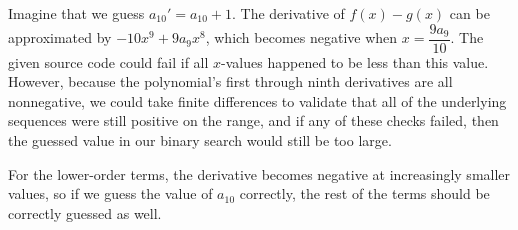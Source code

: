 \documentclass[10pt]{article}
\begin{document}
\begin{flushleft}
Imagine that we guess $a_{10}' = a_{10} + 1$. The derivative of $f(x) - g(x)$ can be approximated by $-10x^9 + 9a_9 x^8$,
which becomes negative when $x = \dfrac{9a_9}{10}$. The given source code could fail if all $x$-values happened to be less than this value.
However, because the polynomial's first through ninth derivatives are all nonnegative, we could take finite differences to validate
that all of the underlying sequences were still positive on the range, and if any of these checks failed, then the guessed value in our binary
search would still be too large.

For the lower-order terms, the derivative becomes negative at increasingly smaller values, so if we guess the value of $a_{10}$ correctly, the rest
of the terms should be correctly guessed as well.

\end{flushleft}
\end{document}
